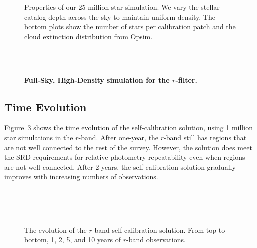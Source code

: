 \documentclass[12pt,preprint]{aastex}
\begin{document}
\begin{figure}
\caption{Properties of our 25 million star simulation.  We vary the stellar catalog depth across the sky to maintain uniform density.  The bottom plots show the number of stars per calibration patch and the cloud extinction distribution from Opsim. \label{fig:25mil_about}}
\end{figure}

\begin{figure}
 \\
 \\
\caption{ {\bf Full-Sky, High-Density simulation for the $r$-filter.  }  \label{fig:25mil}}
\end{figure}


\subsection{Time Evolution}

Figure~\ref{fig:timeevo} shows the time evolution of the self-calibration solution, using 1 million star simulations in the $r$-band.  After one-year, the $r$-band still has regions that are not well connected to the rest of the survey.  However, the solution does meet the SRD requirements for relative photometry repeatability even when regions are not well connected.  After 2-years, the self-calibration solution gradually improves with increasing numbers of observations.  



\begin{figure}
 \\
 \\
 \\
\caption{The evolution of the $r$-band self-calibration solution.  From top to bottom, 1, 2, 5, and 10 years of $r$-band observations.   \label{fig:timeevo}}
\end{figure}
\end{document}
